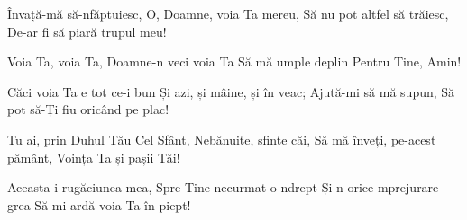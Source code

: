 \beginverse
Învață-mă să-nfăptuiesc,
O, Doamne, voia Ta mereu,
Să nu pot altfel să trăiesc,
De-ar fi să piară trupul meu!
\endverse

\beginchorus
Voia Ta, voia Ta,
Doamne-n veci voia Ta
Să mă umple deplin
Pentru Tine, Amin!
\endchorus

\beginverse
Căci voia Ta e tot ce-i bun
Și azi, și mâine, și în veac;
Ajută-mi să mă supun,
Să pot să-Ți fiu oricând pe plac!
\endverse

\beginverse
Tu ai, prin Duhul Tău Cel Sfânt,
Nebănuite, sfinte căi,
Să mă înveți, pe-acest pământ,
Voința Ta și pașii Tăi!
\endverse

\beginverse
Aceasta-i rugăciunea mea,
Spre Tine necurmat o-ndrept
Și-n orice-mprejurare grea
Să-mi ardă voia Ta în piept!
\endverse
\endsong